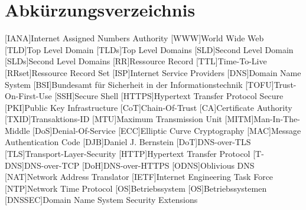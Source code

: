 \documentclass[Bachelor, BIC, german]{twbook}
\begin{document}
\chapter*{Abkürzungsverzeichnis}
\begin{acronym}[XXXXXX]
    [IANA]{Internet Assigned Numbers Authority}
    [WWW]{World Wide Web}
    [TLD]{Top Level Domain}
    [TLDs]{Top Level Domains}
    [SLD]{Second Level Domain}
    [SLDs]{Second Level Domains}
    [RR]{Ressource Record}
    [TTL]{Time-To-Live}
    [RRset]{Ressource Record Set}
    [ISP]{Internet Service Providers}
    [DNS]{Domain Name System}
    [BSI]{Bundesamt für Sicherheit in der Informationstechnik}
    [TOFU]{Trust-On-First-Use}
    [SSH]{Secure Shell}
    [HTTPS]{Hypertext Transfer Protocol Secure}
    [PKI]{Public Key Infrastructure}
    [CoT]{Chain-Of-Trust}
    [CA]{Certificate Authority}
    [TXID]{Transaktions-ID}
    [MTU]{Maximum Transmission Unit}
    [MITM]{Man-In-The-Middle}
    [DoS]{Denial-Of-Service}
    [ECC]{Elliptic Curve Cryptography}
    [MAC]{Message Authentication Code}
    [DJB]{Daniel J. Bernstein}
    [DoT]{DNS-over-TLS}
    [TLS]{Transport-Layer-Security}
    [HTTP]{Hypertext Transfer Protocol}
    [T-DNS]{DNS-over-TCP}
    [DoH]{DNS-over-HTTPS}
    [ODNS]{Oblivious DNS}
    [NAT]{Network Address Translator}
    [IETF]{Internet Engineering Task Force}
    [NTP]{Network Time Protocol}
    [OS]{Betriebssystem}
    [OS]{Betriebssystemen}
    [DNSSEC]{Domain Name System Security Extensions}
\end{acronym}




\end{document}
